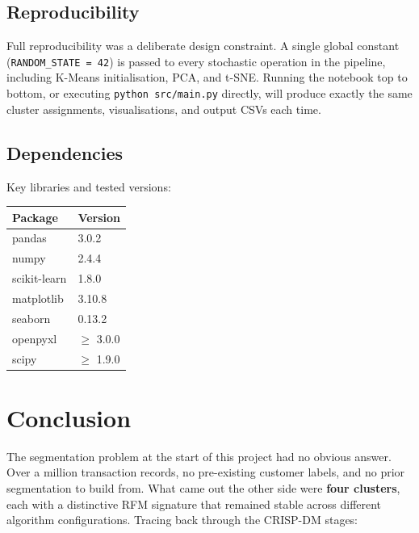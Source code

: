 \documentclass[12pt, a4paper]{article}
\begin{document}
\subsection{Reproducibility}

Full reproducibility was a deliberate design constraint. A single global constant (\texttt{RANDOM\_STATE = 42}) is passed to every stochastic operation in the pipeline, including K-Means initialisation, PCA, and t-SNE. Running the notebook top to bottom, or executing \texttt{python src/main.py} directly, will produce exactly the same cluster assignments, visualisations, and output CSVs each time.

\subsection{Dependencies}

Key libraries and tested versions:

\begin{table}[H]
\centering
\begin{tabular}{@{}ll@{}}
\toprule
\textbf{Package} & \textbf{Version} \\
\midrule
pandas       & 3.0.2  \\
numpy        & 2.4.4  \\
scikit-learn & 1.8.0  \\
matplotlib   & 3.10.8 \\
seaborn      & 0.13.2 \\
openpyxl     & $\geq$ 3.0.0 \\
scipy        & $\geq$ 1.9.0 \\
\bottomrule
\end{tabular}
\end{table}

\section{Conclusion}\label{sec:conclusion}

The segmentation problem at the start of this project had no obvious answer. Over a million transaction records, no pre-existing customer labels, and no prior segmentation to build from. What came out the other side were \textbf{four clusters}, each with a distinctive RFM signature that remained stable across different algorithm configurations. Tracing back through the CRISP-DM stages:
\end{document}
